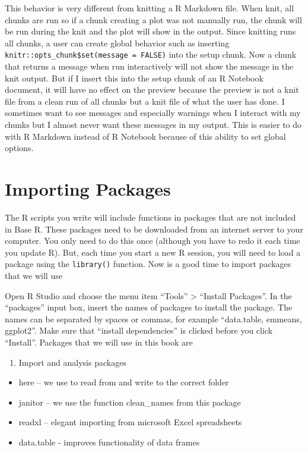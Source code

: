 \documentclass[]{book}
\providecommand{\tightlist}{%
  \setlength{\itemsep}{0pt}\setlength{\parskip}{0pt}}
\begin{document}
This behavior is very different from knitting a R Markdown file. When knit, all chunks are run so if a chunk creating a plot was not manually run, the chunk will be run during the knit and the plot will show in the output. Since knitting runs all chunks, a user can create global behavior such as inserting \texttt{knitr::opts\_chunk\$set(message\ =\ FALSE)} into the setup chunk. Now a chunk that returns a message when run interactively will not show the message in the knit output. But if I insert this into the setup chunk of an R Notebook document, it will have no effect on the preview because the preview is not a knit file from a clean run of all chunks but a knit file of what the user has done. I sometimes want to see messages and especially warnings when I interact with my chunks but I almost never want these messages in my output. This is easier to do with R Markdown instead of R Notebook because of this ability to set global options.

\hypertarget{importing-packages}{%
\section{Importing Packages}\label{importing-packages}}

The R scripts you write will include functions in packages that are not included in Base R. These packages need to be downloaded from an internet server to your computer. You only need to do this once (although you have to redo it each time you update R). But, each time you start a new R session, you will need to load a package using the \texttt{library()} function. Now is a good time to import packages that we will use

Open R Studio and choose the menu item ``Tools'' \textgreater{} ``Install Packages''. In the ``packages'' input box, insert the names of packages to install the package. The names can be separated by spaces or commas, for example ``data.table, emmeans, ggplot2''. Make sure that ``install dependencies'' is clicked before you click ``Install''. Packages that we will use in this book are

\begin{enumerate}
\def\labelenumi{\arabic{enumi}.}
\tightlist
\item
  Import and analysis packages
\end{enumerate}

\begin{itemize}
\tightlist
\item
  here -- we use to read from and write to the correct folder
\item
  janitor -- we use the function clean\_names from this package
\item
  readxl -- elegant importing from microsoft Excel spreadsheets
\item
  data.table - improves functionality of data frames
\end{itemize}
\end{document}

